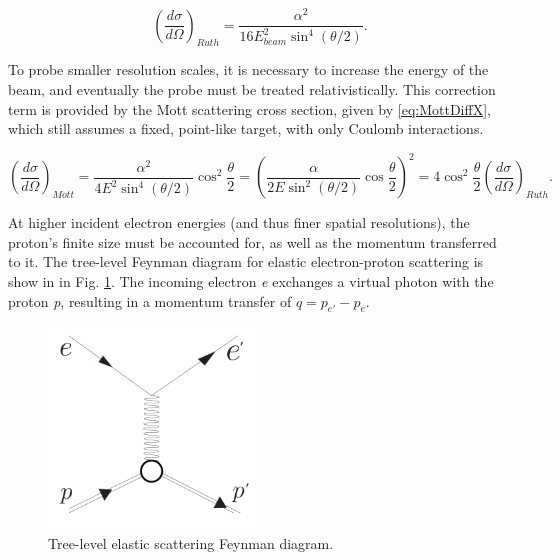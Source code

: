         
        \begin{equation}\label{eq:RutherfordDiffX}
            (\frac{d\sigma}{d\Omega})_{Ruth} = \frac{\alpha^2}{16E^2_{beam}\sin^4{(\theta/2)}}.
        \end{equation}




        To probe smaller resolution scales, it is necessary to increase the energy of the beam, and eventually the probe must be treated relativistically. This correction term is provided by the Mott scattering cross section, given by \eqref{eq:MottDiffX}, which still assumes a fixed, point-like target, with only Coulomb interactions.
            
                \begin{equation}\label{eq:MottDiffX}
                     (\frac{d\sigma}{d\Omega})_{Mott} = \frac{\alpha^2}{4E^2\sin^4{(\theta/2)}}\cos^2{\frac{\theta}{2}} = \left( \frac{\alpha}{2E\sin^2{(\theta/2)}}\cos{\frac{\theta}{2}} \right)^2 = 4\cos^2{\frac{\theta}{2}}(\frac{d\sigma}{d\Omega})_{Ruth}.
                \end{equation}
        
    
 
         At higher incident electron energies (and thus finer spatial resolutions), the proton's finite size must be accounted for, as well as the momentum transferred to it. The tree-level Feynman diagram for elastic electron-proton scattering is show in in Fig. \ref{fig:feynmanElastic}. The incoming electron \textit{e} exchanges a virtual photon with the proton \textit{p}, resulting in a momentum transfer of $q = p_{e'} - p_{e}$. 
         
        \begin{figure}[H]
            \centering
            \includegraphics[width=0.5\textwidth]{Chapters/Ch1-Intro/Ch1-Sec1-Background/pics/elastic_feynamn.png}
            \caption{Tree-level elastic scattering Feynman diagram.}
            \label{fig:feynmanElastic}
        \end{figure}

